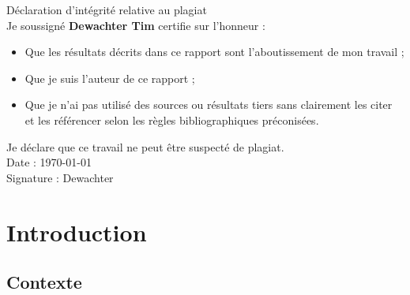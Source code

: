 \documentclass[11pt, a4paper]{article}
\begin{document}
\newpage
\begin{center}
  \vspace*{\fill}

  Déclaration d'intégrité relative au plagiat \\

  

  Je soussigné \textbf{Dewachter Tim} certifie sur l'honneur : \\

  \begin{itemize}
    \centering
    \item Que les résultats décrits dans ce rapport sont l'aboutissement de mon travail ;\\
    \item Que je suis l'auteur de ce rapport ;\\
    \item Que je n'ai pas utilisé des sources ou résultats tiers sans clairement les citer et les référencer selon les règles bibliographiques préconisées.\\
  \end{itemize}

  Je déclare que ce travail ne peut être suspecté de plagiat. \\


  Date : \today\\

  

  Signature : Dewachter

  \vspace*{\fill}
\end{center}
\newpage

\tableofcontents

\newpage

\section{Introduction}

\subsection{Contexte}
\end{document}

